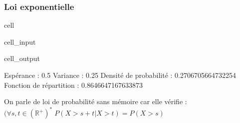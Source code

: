 \documentclass[letterpaper,10pt,french]{sphinxmanual}
\begin{document}
\subsubsection{Loi exponentielle}
\label{\detokenize{elemstats:loi-exponentielle}}
\begin{sphinxuseclass}{cell}
\begin{sphinxuseclass}{cell_input}
\begin{sphinxVerbatim}[commandchars=\\\{\}]
   

   
   
   

 
 
    
    
\end{sphinxVerbatim}

\end{sphinxuseclass}
\begin{sphinxuseclass}{cell_output}
\begin{sphinxVerbatim}[commandchars=\\\{\}]
Espérance :  0.5
Variance :  0.25
Densité de probabilité :  0.2706705664732254
Fonction de répartition :  0.8646647167633873
\end{sphinxVerbatim}

\end{sphinxuseclass}
\end{sphinxuseclass}
\sphinxAtStartPar
On parle de loi de probabilité sans mémoire car elle vérifie :
\( (\forall s,t\in(\mathbb{R}^+)^*\; P(X>s+t |X>t) = P(X>s)\)
\end{document}
